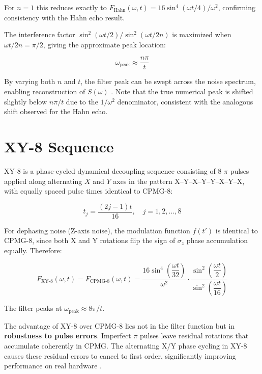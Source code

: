 \documentclass[12pt]{article}
\begin{document}
For $n=1$ this reduces exactly to $F_\text{Hahn}(\omega, t) = 16\sin^4(\omega t/4)/\omega^2$, confirming consistency with the Hahn echo result.

The interference factor $\sin^2(\omega t/2)/\sin^2(\omega t/2n)$ is maximized when $\omega t/2n = \pi/2$, giving the approximate peak location:

\begin{equation}
    \omega_\text{peak} \approx \frac{n\pi}{t}
\end{equation}

By varying both $n$ and $t$, the filter peak can be swept across the noise spectrum, enabling reconstruction of $S(\omega)$ \cite{Alvarez2011}. Note that the true numerical peak is shifted slightly below $n\pi/t$ due to the $1/\omega^2$ denominator, consistent with the analogous shift observed for the Hahn echo.

\section{XY-8 Sequence}

XY-8 is a phase-cycled dynamical decoupling sequence consisting of 8 $\pi$ pulses applied along alternating $X$ and $Y$ axes in the pattern X--Y--X--Y--Y--X--Y--X, with equally spaced pulse times identical to CPMG-8:

\begin{equation}
    t_j = \frac{(2j-1)t}{16}, \quad j = 1, 2, \ldots, 8
\end{equation}

For dephasing noise (Z-axis noise), the modulation function $f(t')$ is identical to CPMG-8, since both X and Y rotations flip the sign of $\sigma_z$ phase accumulation equally. Therefore:

\begin{equation}
    \boxed{F_\text{XY-8}(\omega, t) = F_\text{CPMG-8}(\omega, t) = \frac{16\sin^4\!\left(\dfrac{\omega t}{32}\right)}{\omega^2} \cdot \frac{\sin^2\!\left(\dfrac{\omega t}{2}\right)}{\sin^2\!\left(\dfrac{\omega t}{16}\right)}}
\end{equation}

The filter peaks at $\omega_\text{peak} \approx 8\pi/t$.

The advantage of XY-8 over CPMG-8 lies not in the filter function but in \textbf{robustness to pulse errors}. Imperfect $\pi$ pulses leave residual rotations that accumulate coherently in CPMG. The alternating X/Y phase cycling in XY-8 causes these residual errors to cancel to first order, significantly improving performance on real hardware \cite{Gullion1990}.
\end{document}
